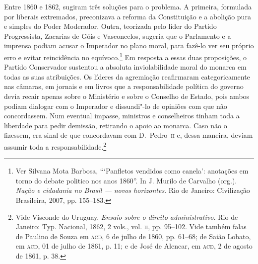 Entre 1860 e 1862, sugiram três soluções para o problema. A primeira,
formulada por liberais extremados, preconizava a reforma da
Constituição e a abolição pura e simples do Poder Moderador. Outra,
teorizada pelo líder do Partido Progressista, Zacarias de Góis e
Vasconcelos, sugeria que o Parlamento e a imprensa podiam acusar o
Imperador no plano moral, para fazê-lo ver seu próprio erro e evitar
reincidência no equívoco.\footnote{ Ver Silvana Mota Barbosa,
“‘Panfletos vendidos como canela’: anotações em torno do debate
politico nos anos 1860”. In J. Murilo de Carvalho (org.). \textit{Nação
e cidadania no Brasil --- novos horizontes}. Rio de Janeiro: Civilização
Brasileira, 2007, pp. 155--183.} Em resposta a essas duas proposições, o
Partido Conservador sustentou a absoluta inviolabilidade moral do
monarca em todas as suas atribuições. Os líderes da agremiação
reafirmaram categoricamente nas câmaras, em jornais e em livros que a
responsabilidade política do governo devia recair apenas sobre o
Ministério e sobre o Conselho de Estado, pois ambos podiam dialogar com
o Imperador e dissuadi"-lo de opiniões com que não concordassem.  Num
eventual impasse, ministros e conselheiros tinham toda a liberdade para
pedir demissão, retirando o apoio ao monarca. Caso não o fizessem, era
sinal de que concordavam com D.~Pedro~\textsc{ii} e, dessa maneira, deviam
assumir toda a responsabilidade.\footnote{ Vide Visconde do Uruguay.
\textit{Ensaio sobre o direito administrativo.} Rio de Janeiro: Typ.
Nacional, 1862, 2 vols., vol. \textsc{ii}, pp. 95--102. Vide também falas de
Paulino de Souza em \textsc{acd}, 6 de julho de 1860, pp. 61--68; de Saião
Lobato, em \textsc{acd}, 01 de julho de 1861, p. 11; e de José de Alencar, em
\textsc{acd}, 2 de agosto de 1861, p. 38.} 

